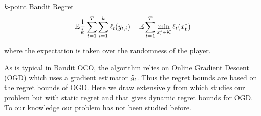 \begin{defn}{$k$-point Bandit Regret}
	$$\mathbb{E} \frac{1}{k} \sum_{t=1}^T \sum_{i=1}^k \ell_t(y_{t,i}) - \mathbb{E} \sum_{t=1}^T \min_{x^*_t\in \mathcal{K}}\ell_t(x^*_t)$$
	
	where the expectation is taken over the randomness of the player.
\end{defn}

As is typical in Bandit OCO, the algorithm relies on Online Gradient Descent (OGD) which uses a gradient estimator $\tilde{g}_t$. Thus the regret bounds are based on the regret bounds of OGD. Here we draw extensively from \citet{agarwal2010optimal} which studies our problem but with static regret and \citet{mokhtari2016online} that gives dynamic regret bounds for OGD. To our knowledge our problem has not been studied before.



